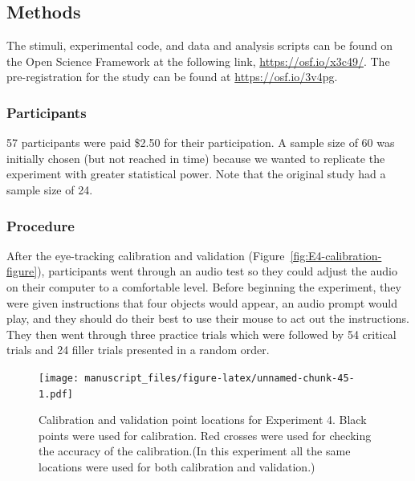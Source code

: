 \documentclass[
  man,floatsintext]{apa6}
\begin{document}
\hypertarget{methods-3}{%
\subsection{Methods}\label{methods-3}}

The stimuli, experimental code, and data and analysis scripts can be
found on the Open Science Framework at the following link,
\url{https://osf.io/x3c49/}. The pre-registration
for the study can be found at \url{https://osf.io/3v4pg}.

\hypertarget{participants-4}{%
\subsubsection{Participants}\label{participants-4}}

57 participants were paid \$2.50 for their participation. A sample size of 60 was initially chosen (but not reached in time) because we wanted to replicate the experiment with greater statistical power. Note that the original study had a sample size of 24.

\hypertarget{procedure-3}{%
\subsubsection{Procedure}\label{procedure-3}}

After the eye-tracking calibration and validation (Figure~\ref{fig:E4-calibration-figure}), participants went through an audio
test so they could adjust the audio on their computer to a comfortable
level. Before beginning the experiment, they were given instructions
that four objects would appear, an audio prompt would play, and they
should do their best to use their mouse to act out the instructions.
They then went through three practice trials which were followed by 54
critical trials and 24 filler trials presented in a random order.

\begin{figure}
\centering
\texttt{[image: manuscript\_files/figure-latex/unnamed-chunk-45-1.pdf]}
\caption{\label{fig:unnamed-chunk-45}Calibration and validation point locations for Experiment 4. Black points were used for calibration. Red crosses were used for checking the accuracy of the calibration.(In this experiment all the same locations were used for both calibration and validation.)}
\end{figure}
\end{document}
